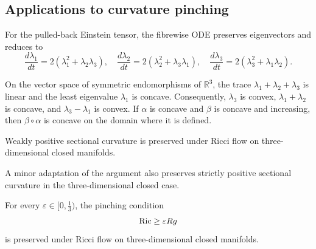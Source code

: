 \subsection{Applications to curvature pinching}

\begin{remark}
\label{topping-ch9-ode-eigenvalue-system}
For the pulled-back Einstein tensor, the fibrewise ODE preserves eigenvectors
and reduces to
\[
\frac{d\lambda_1}{dt}=2(\lambda_1^2+\lambda_2\lambda_3),\quad
\frac{d\lambda_2}{dt}=2(\lambda_2^2+\lambda_3\lambda_1),\quad
\frac{d\lambda_3}{dt}=2(\lambda_3^2+\lambda_1\lambda_2).
\]
\end{remark}

\begin{lemma}
\label{topping-ch9-eigenvalue-convexity}
On the vector space of symmetric endomorphisms of \(\mathbb R^3\), the trace
\(\lambda_1+\lambda_2+\lambda_3\) is linear and the least eigenvalue
\(\lambda_1\) is concave. Consequently, \(\lambda_3\) is convex,
\(\lambda_1+\lambda_2\) is concave, and \(\lambda_3-\lambda_1\) is convex.
If \(\alpha\) is concave and \(\beta\) is concave and increasing, then
\(\beta\circ\alpha\) is concave on the domain where it is defined.
\end{lemma}

\begin{theorem}
\label{topping-ch9-positive-sectional-preserved}
Weakly positive sectional curvature is preserved under Ricci flow on
three-dimensional closed manifolds.
\end{theorem}

\begin{remark}
\label{topping-ch9-positive-sectional-strong}
A minor adaptation of the argument also preserves strictly positive sectional
curvature in the three-dimensional closed case.
\end{remark}

\begin{theorem}
\label{topping-ch9-ricci-pinching-preserved}
For every \(\varepsilon\in[0,\tfrac13)\), the pinching condition
\[
\operatorname{Ric}\ge \varepsilon Rg
\]
is preserved under Ricci flow on three-dimensional closed manifolds.
\end{theorem}

